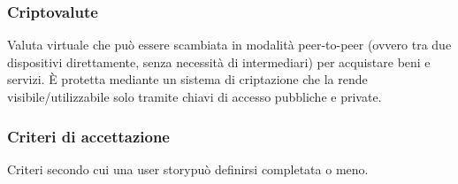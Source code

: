 \subsubsection*{Criptovalute}
Valuta virtuale che può essere scambiata in modalità peer-to-peer (ovvero tra due dispositivi direttamente, senza necessità di intermediari) per acquistare beni e servizi. È protetta mediante un sistema di criptazione che la rende visibile/utilizzabile solo tramite chiavi di accesso pubbliche e private. 

\subsubsection*{Criteri di accettazione}
Criteri secondo cui una user story\glo può definirsi completata o meno.